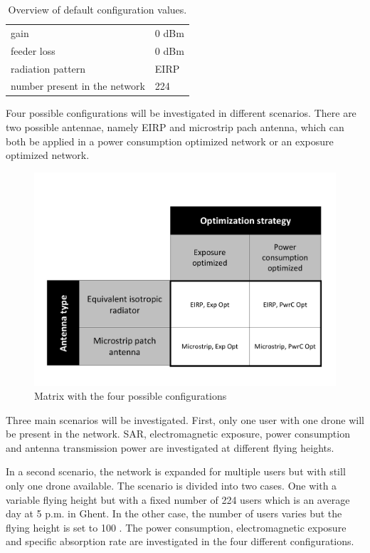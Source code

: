 \documentclass[twocolumn]{phdsymp} %
\begin{document}
\begin{table}[!htb]
\begin{tabular}[t]{ll}
        \hspace{3mm} gain                      & 0 dBm   \\ 
        \hspace{3mm} feeder loss               & 0 dBm   \\ 
        \hspace{3mm} radiation pattern         & EIRP  \\
        \hspace{3mm} number present in the network         & 224  \\
        \toprule
\end{tabular}
\caption{Overview of default configuration values.}
\end{table}


Four possible configurations  will be investigated in different scenarios. There are two possible antennae, namely EIRP 
and microstrip pach antenna, which can both be applied in a power consumption optimized network or an exposure optimized network.

\begin{figure}[h!]
  \includegraphics[width=\linewidth]{fourCasesMatrix.pdf}
  \caption{Matrix with the four possible configurations}
  \label{fig:fourCasesMatrix}
\end{figure}

Three main scenarios will be investigated. 
First, only one user with one drone will be present in the network. SAR, electromagnetic exposure, power consumption 
and antenna transmission power are investigated at different flying heights.

In a second scenario, the network is expanded for multiple users but with still only one drone available. 
The scenario is divided into two cases. One with a variable flying height but with a fixed 
number of 224 users which is an average day 
at 5 p.m. in Ghent. In the other case, the number of users varies but the flying height is set to 100 \cite{J2}.
The power consumption, electromagnetic exposure and specific 
absorption rate are investigated in the four different configurations.
\end{document}
